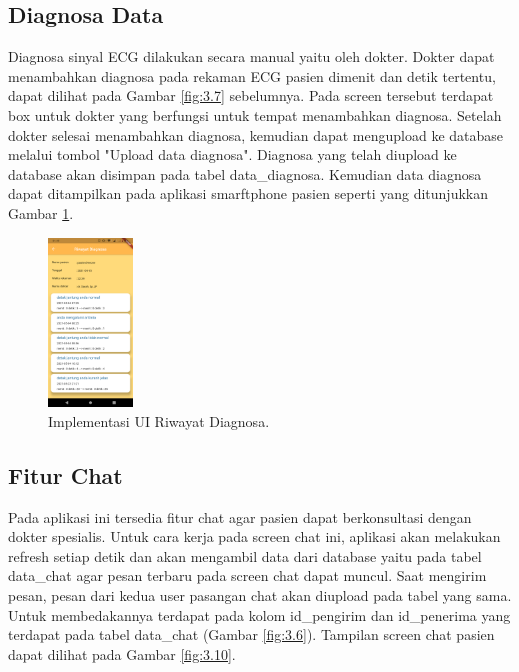 \documentclass[conference]{IEEEtran}
\begin{document}
	\vspace{1ex} 
	\subsection{Diagnosa Data}
	\vspace{1ex}
	
	Diagnosa sinyal ECG dilakukan secara manual yaitu oleh dokter. Dokter dapat menambahkan diagnosa pada rekaman ECG pasien dimenit dan detik tertentu, dapat dilihat pada Gambar \ref{fig:3.7} sebelumnya. Pada screen tersebut terdapat box untuk dokter yang berfungsi untuk tempat menambahkan diagnosa. Setelah dokter selesai menambahkan diagnosa, kemudian dapat mengupload ke database melalui tombol "Upload data diagnosa". Diagnosa yang telah diupload ke database akan disimpan pada tabel data\_diagnosa. Kemudian data diagnosa dapat ditampilkan pada aplikasi smarftphone pasien seperti yang ditunjukkan Gambar \ref{fig:3.9}.
	
	\begin{figure}[h] \centering
		\includegraphics[width=0.2\textwidth]{img/layar_riwayatdiagnosa.png}
		\caption{Implementasi UI Riwayat Diagnosa.}
		\label{fig:3.9}
	\end{figure}
	
	\vspace{1ex}
	\subsection{Fitur Chat}
	\vspace{1ex}
	
	Pada aplikasi ini tersedia fitur chat agar pasien dapat berkonsultasi dengan dokter spesialis. Untuk cara kerja pada screen chat ini, aplikasi akan melakukan refresh setiap detik dan akan mengambil data dari database yaitu pada tabel data\_chat agar pesan terbaru pada screen chat dapat muncul. Saat mengirim pesan, pesan dari kedua user pasangan chat akan diupload pada tabel yang sama. Untuk membedakannya terdapat pada kolom id\_pengirim dan id\_penerima yang terdapat pada tabel data\_chat (Gambar \ref{fig:3.6}). Tampilan screen chat pasien dapat dilihat pada Gambar \ref{fig:3.10}.
	
\end{document}
